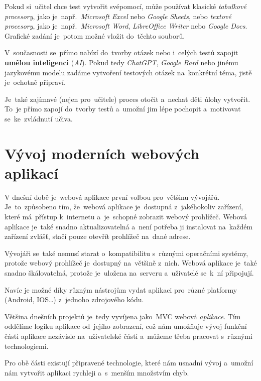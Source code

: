 \documentclass[10pt,a4paper]{article}
\begin{document}
            Pokud si~učitel chce test vytvořit svépomocí, může používat klasické \emph{tabulkové procesory}, jako je~např.~\emph{Microsoft Excel} nebo \emph{Google Sheets}, nebo \emph{textové procesory}, jako je~např.~\emph{Microsoft Word}, \emph{LibreOffice Writer} nebo \emph{Google Docs}. Grafické zadání je~potom možné vložit do~těchto souborů.

            V~současnosti se~přímo nabízí do~tvorby otázek nebo i~celých testů zapojit \textbf{umělou inteligenci} (\emph{AI}). Pokud tedy \emph{ChatGPT}, \emph{Google Bard} nebo jinému jazykovému modelu zadáme vytvoření testových otázek na~konkrétní téma, jistě je~ochotně připraví.

            Je~také zajímavé (nejen pro~učitele) proces otočit a~nechat děti úlohy vytvořit. To~je přímo zapojí do~tvorby testů a~umožní jim lépe pochopit a~motivovat se~ke~zvládnutí učiva. \cite{hedlovam:chybavresenim}

    \section{Vývoj moderních webových aplikací}
        V dnešní době je~webová aplikace první volbou pro~většinu vývojářů. Je~to~způsobeno tím, že~webová aplikace je~dostupná z~jakéhokoliv zařízení, které má~přístup k~internetu a~je~schopné zobrazit webový prohlížeč. Webová aplikace je~také snadno aktualizovatelná a~není potřeba ji instalovat na~každém zařízení zvlášť, stačí pouze otevřít prohlížeč na~dané adrese.
        
        Vývojáři se~také nemusí starat o~kompatibilitu s~různými operačními systémy, protože webový prohlížeč
        je~dostupný na~většině z~nich. Webová aplikace je~také snadno škálovatelná, protože je~uložena na~serveru a~uživatelé se~k~ní připojují.
        
        Navíc je možné díky různým nástrojům vydat aplikaci pro~různé platformy (Android, IOS\dots) z~jednoho zdrojového kódu.\cite{adobe:webapp}

        Většina dnešních projektů je~tedy vyvíjena jako~MVC webová \emph{aplikace}. Tím oddělíme logiku aplikace od~jejího zobrazení, což nám umožňuje vývoj funkční části aplikace nezávisle na~uživatelské části a~můžeme třeba pracovat s~různými technologiemi.
        
        Pro obě části existují připravené technologie, které nám usnadní vývoj a~umožní nám vytvořit aplikaci rychleji a~s~menším množstvím chyb.
\end{document}
